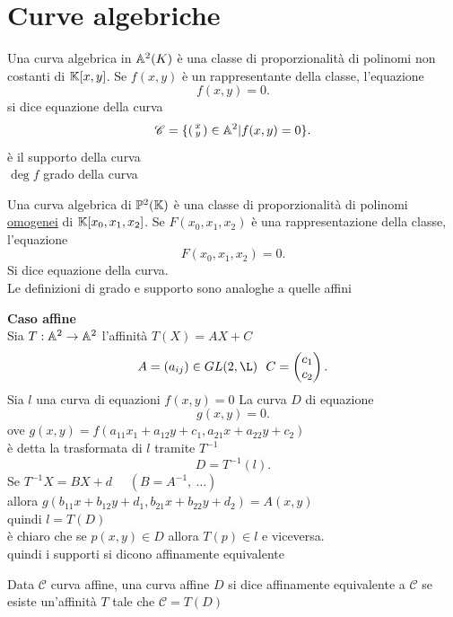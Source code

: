 \documentclass[12px]{article}
\begin{document}
\section{Curve algebriche}
\begin{defi}
	Una curva algebrica in $\mathbb{A}^2(K)$ è una classe di proporzionalità di polinomi non costanti di  $\mathbb{K}[x,y]$. Se  $f(x,y)$ è un rappresentante della classe, l'equazione 
	\[
	f(x,y) = 0
	.\] si dice equazione della curva
	\[
		\mathscr{C}= \{\left(\begin{smallmatrix}x\\y\end{smallmatrix}\right)\in \mathbb{A}^2|f(x,y) = 0\}
	.\] è il supporto della curva\\
	$\deg f$ grado della curva
\end{defi}
\begin{defi}
	Una curva algebrica di $\mathbb{P}^2(\mathbb{K})$ è una classe di proporzionalità di polinomi \underline{omogenei} di $\mathbb{K}[x_0,x_1,x_2]$. Se $F(x_0,x_1,x_2)$ è una rappresentazione della classe, l'equazione
	\[
	F(x_0,x_1,x_2)=0
	.\] 
	Si dice equazione della curva.\\ Le definizioni di grado e supporto sono analoghe a quelle affini
\end{defi}
\textbf{Caso affine}\\
Sia $T: \mathbb{A}^2 \rightarrow \mathbb{A}^2$ l'affinità $T(X) = AX + C$
 \[
	 A = (a_{ij})\in GL(2,\L) \ \ C = \matrice{c_1\\c_2}
.\] 
Sia $l$ una curva di equazioni $f(x,y) = 0$
La curva $D$ di equazione 
\[
g(x,y) =0 
.\] 
ove $g(x,y) = f(a_{11}x_1+a_{12}y+c_1,a_{21}x+a_{22}y+c_2)$ \\
è detta la trasformata di $l$ tramite $T^{-1}$
 \[
 D = T^{-1}(l)
.\] 
Se $T^{-1}X = BX + d$ \ \ $(B = A^{-1}, \ \ldots)$\\
allora  $g(b_{11}x + b_{12}y + d_1, b_{21}x+b_{22}y + d_2) = A(x,y)$\\
quindi $l = T(D)$\\
è chiaro che se  $p(x,y)\in D$ allora $T(p)\in l$ e viceversa.\\
quindi i supporti si dicono affinamente equivalente
\begin{defi}
	Data $\mathscr{C}$ curva affine, una curva affine $D$  si dice affinamente equivalente a $\mathscr{C}$ se esiste un'affinità $T$ tale che $\mathscr{C} = T(D)$
\end{defi}
\end{document}
